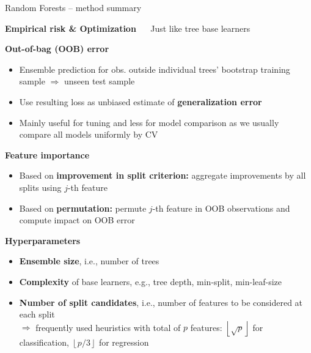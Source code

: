 \documentclass[11pt,compress,t,notes=noshow, xcolor=table]{beamer}
\newcommand{\highlight}[1]{\textcolor{hlcol}{\textbf{#1}}}
\begin{document}
\begin{frame2}{Random Forests -- method summary}
\framebreak

\highlight{Empirical risk \& Optimization} ~~ Just like tree base learners

\medskip

\highlight{Out-of-bag (OOB) error}
\begin{itemize}
  \item Ensemble prediction for obs. outside individual trees' bootstrap training sample $\Rightarrow$ unseen test sample
  \item Use resulting loss as unbiased estimate of \textbf{generalization error}
  \item Mainly useful for tuning and less for model comparison as we usually compare all models uniformly by CV
\end{itemize}

\medskip

\highlight{Feature importance}

\begin{itemize}
  \item Based on \textbf{improvement in split criterion:} aggregate improvements 
  by all splits using $j$-th feature
  \item Based on \textbf{permutation:} permute $j$-th feature in 
  OOB observations and compute impact on OOB error
\end{itemize}

\medskip

\framebreak

\highlight{Hyperparameters}

\begin{itemize}
  \item \textbf{Ensemble size}, i.e., number of trees
  \item \textbf{Complexity} of base learners, e.g., tree depth, min-split, min-leaf-size
  \item \textbf{Number of split candidates}, i.e., number of features to be considered at each split \\
  $\Rightarrow$ frequently used heuristics with total of $p$ features: 
  $\left \lfloor{\sqrt{p}}\right \rfloor$ for classification, $\left \lfloor{p/3}\right \rfloor$ for regression
\end{itemize}

\end{frame2}
\end{document}
